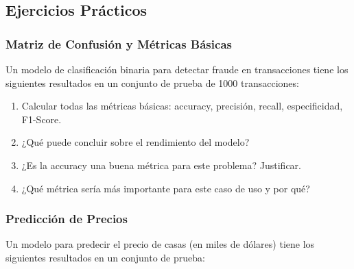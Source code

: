 \documentclass[12pt]{article}
\begin{document}
\subsection{Ejercicios Prácticos}

\subsubsection{Matriz de Confusión y Métricas Básicas}

Un modelo de clasificación binaria para detectar fraude en transacciones tiene los siguientes resultados en un conjunto de prueba de 1000 transacciones:

\begin{center}
\end{center}

\begin{enumerate}
    \item[a.] Calcular todas las métricas básicas: accuracy, precisión, recall, especificidad, F1-Score.
    \item[b.] ¿Qué puede concluir sobre el rendimiento del modelo?
    \item[c.] ¿Es la accuracy una buena métrica para este problema? Justificar.
    \item[d.] ¿Qué métrica sería más importante para este caso de uso y por qué?
\end{enumerate}

\subsubsection{Predicción de Precios}

Un modelo para predecir el precio de casas (en miles de dólares) tiene los siguientes resultados en un conjunto de prueba:
\end{document}
